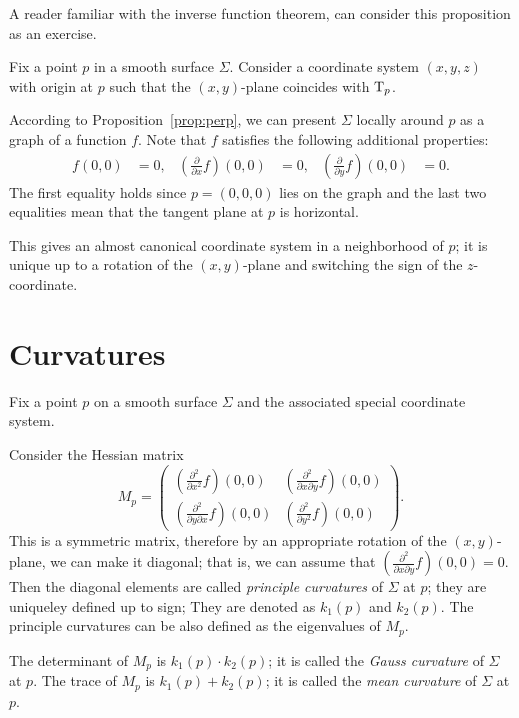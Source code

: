 A reader familiar with the inverse function theorem, can consider this proposition as an exercise.

Fix a point $p$ in a smooth surface $\Sigma$.
Consider a coordinate system $(x,y,z)$ with origin at $p$ such that the $(x,y)$-plane coincides with $\mathrm{T}_p$.

According to Proposition~\ref{prop:perp}, 
we can present $\Sigma$ locally around $p$ as a graph of a function $f$.
Note that $f$ satisfies the following additional properties:
\begin{align*}
f(0,0)&=0,
&
(\tfrac{\partial}{\partial x}f)(0,0)&=0,
&
(\tfrac{\partial}{\partial y}f)(0,0)&=0.
\end{align*}
The first equality holds since $p=(0,0,0)$ lies on the graph and the last two equalities mean that the tangent plane at $p$ is horizontal.

This gives an almost canonical coordinate system in a neighborhood of $p$;
it is unique up to a rotation of  the $(x,y)$-plane and switching the sign of the $z$-coordinate.

\section{Curvatures}

Fix a point $p$ on a smooth surface $\Sigma$ and the associated special coordinate system. 

Consider the Hessian matrix 
\[M_p=\begin{pmatrix}
   (\tfrac{\partial^2}{\partial x^2}f)(0,0)
   &(\tfrac{\partial^2}{\partial x\partial y}f)(0,0)
   \\
   (\tfrac{\partial^2}{\partial y\partial x}f)(0,0)
   &(\tfrac{\partial^2}{\partial y^2}f)(0,0)
  \end{pmatrix}.
\]
This is a symmetric matrix, therefore by an appropriate rotation of the $(x,y)$-plane, we can make it diagonal;
that is, we can assume that $(\tfrac{\partial^2}{\partial x\partial y}f)(0,0)=0$.
Then the diagonal elements are called \emph{principle curvatures} of $\Sigma$ at $p$;
they are uniqueley defined up to sign;
They are denoted as $k_1(p)$ and $k_2(p)$.
The principle curvatures can be also defined as the eigenvalues of $M_p$.

The determinant of $M_p$ is $k_1(p)\cdot k_2(p)$;
it is called the \emph{Gauss curvature} of $\Sigma$ at $p$.
The trace of $M_p$ is $k_1(p)+ k_2(p)$;
it is called the \emph{mean curvature} of $\Sigma$ at $p$.

